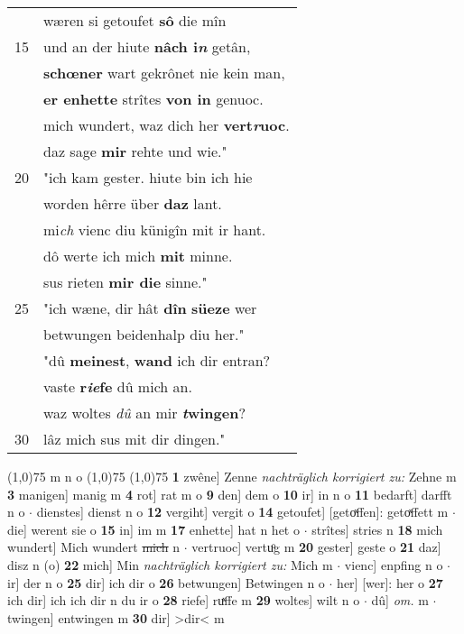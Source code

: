 \documentclass[8pt,a4paper,notitlepage]{article}
\begin{document}
\begin{table}[ht]
\begin{minipage}[t]{0.5\linewidth}
\begin{tabular}{rl}
 & wæren si getoufet \textbf{sô} die mîn\\ 
15 & und an der hiute \textbf{nâch i\textit{n}} getân,\\ 
 & \textbf{schœner} wart gekrônet nie kein man,\\ 
 & \textbf{er enhette} strîtes \textbf{von in} genuoc.\\ 
 & mich wundert, waz dich her \textbf{vert\textit{r}uoc}.\\ 
 & daz sage \textbf{mir} rehte und wie."\\ 
20 & "ich kam gester. hiute bin ich hie\\ 
 & worden hêrre über \textbf{daz} lant.\\ 
 & mi\textit{ch} vienc diu künigîn mit ir hant.\\ 
 & dô werte ich mich \textbf{mit} minne.\\ 
 & sus rieten \textbf{mir die} sinne."\\ 
25 & "ich wæne, dir hât \textbf{dîn} \textbf{süeze} wer\\ 
 & betwungen beidenhalp diu her."\\ 
 & "dû \textbf{meinest}, \textbf{wand} ich dir entran?\\ 
 & vaste \textbf{r\textit{ie}fe} dû mich an.\\ 
 & waz woltes \textit{dû} an mir \textbf{\textit{t}wingen}?\\ 
30 & lâz mich sus mit dir dingen."\\ 
\end{tabular}
\scriptsize
\line(1,0){75} \newline
m n o \newline
\line(1,0){75} \newline
\newline
\line(1,0){75} \newline
\textbf{1} zwêne] Zenne \textit{nachträglich korrigiert zu:} Zehne m \textbf{3} manigen] manig m \textbf{4} rot] rat m o \textbf{9} den] dem o \textbf{10} ir] in n o \textbf{11} bedarft] darfft n o  $\cdot$ dienstes] dienst n o \textbf{12} vergiht] vergit o \textbf{14} getoufet] [getoͯffen]: getoͯffett m  $\cdot$ die] werent sie o \textbf{15} in] im m \textbf{17} enhette] hat n het o  $\cdot$ strîtes] stries n \textbf{18} mich wundert] Mich wundert \sout{mich} n  $\cdot$ vertruoc] vertuͦg m \textbf{20} gester] geste o \textbf{21} daz] disz n (o) \textbf{22} mich] Min \textit{nachträglich korrigiert zu:} Mich m  $\cdot$ vienc] enpfing n o  $\cdot$ ir] der n o \textbf{25} dir] ich dir o \textbf{26} betwungen] Betwingen n o  $\cdot$ her] [wer]: her o \textbf{27} ich dir] ich ich dir n du ir o \textbf{28} riefe] ruͯffe m \textbf{29} woltes] wilt n o  $\cdot$ dû] \textit{om.} m  $\cdot$ twingen] entwingen m \textbf{30} dir] >dir< m \newline
\end{minipage}
\end{table}
\end{document}
